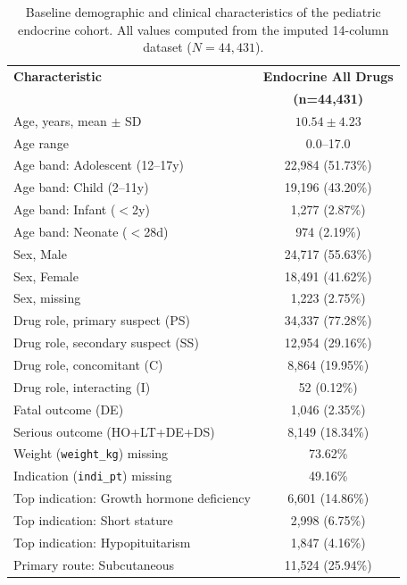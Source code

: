 \documentclass[10pt,twocolumn]{article}
\begin{document}
\begin{table}[!t]
\caption{Baseline demographic and clinical characteristics of the pediatric endocrine cohort. All values computed from the imputed 14-column dataset ($N = 44{,}431$).}
\label{tab:baseline}
\centering\small\setlength{\tabcolsep}{5pt}
\begin{tabular}{|l|c|}
\hline
\rowcolor{tableHead}
\color{white}\textbf{Characteristic} &
\color{white}\textbf{Endocrine All Drugs}\\
\rowcolor{tableHead}
\color{white} &
\color{white}\textbf{(n=44,431)}\\
\hline
\rowcolor{rowA} Age, years, mean $\pm$ SD & $10.54 \pm 4.23$\\
\hline
\rowcolor{rowB} Age range & 0.0--17.0\\
\hline
\rowcolor{rowA} Age band: Adolescent (12--17y) & 22,984 (51.73\%)\\
\hline
\rowcolor{rowB} Age band: Child (2--11y) & 19,196 (43.20\%)\\
\hline
\rowcolor{rowA} Age band: Infant ($<$2y) & 1,277 (2.87\%)\\
\hline
\rowcolor{rowB} Age band: Neonate ($<$28d) & 974 (2.19\%)\\
\hline
\rowcolor{rowA} Sex, Male & 24,717 (55.63\%)\\
\hline
\rowcolor{rowB} Sex, Female & 18,491 (41.62\%)\\
\hline
\rowcolor{rowA} Sex, missing & 1,223 (2.75\%)\\
\hline
\rowcolor{rowB} Drug role, primary suspect (PS) & 34,337 (77.28\%)\\
\hline
\rowcolor{rowA} Drug role, secondary suspect (SS) & 12,954 (29.16\%)\\
\hline
\rowcolor{rowB} Drug role, concomitant (C) & 8,864 (19.95\%)\\
\hline
\rowcolor{rowA} Drug role, interacting (I) & 52 (0.12\%)\\
\hline
\rowcolor{rowB} Fatal outcome (DE) & 1,046 (2.35\%)\\
\hline
\rowcolor{rowA} Serious outcome (HO+LT+DE+DS) & 8,149 (18.34\%)\\
\hline
\rowcolor{rowB} Weight (\texttt{weight\_kg}) missing & 73.62\%\\
\hline
\rowcolor{rowA} Indication (\texttt{indi\_pt}) missing & 49.16\%\\
\hline
\rowcolor{rowB} Top indication: Growth hormone deficiency & 6,601 (14.86\%)\\
\hline
\rowcolor{rowA} Top indication: Short stature & 2,998 (6.75\%)\\
\hline
\rowcolor{rowB} Top indication: Hypopituitarism & 1,847 (4.16\%)\\
\hline
\rowcolor{rowA} Primary route: Subcutaneous & 11,524 (25.94\%)\\
\hline
\end{tabular}
\end{table}
 
\end{document}
